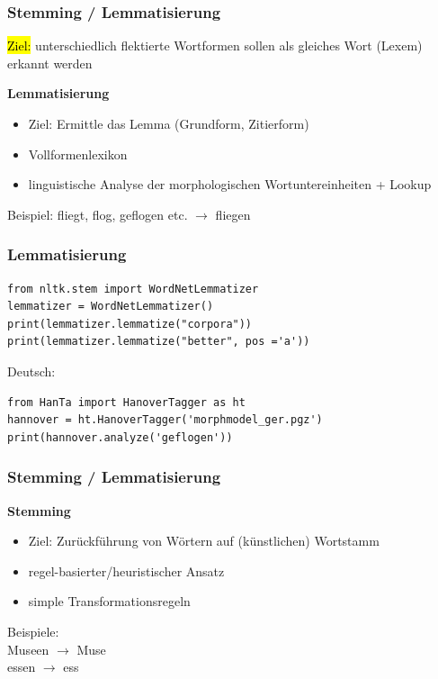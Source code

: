 
\begin{frame}
    \frametitle{Stemming / Lemmatisierung}
    \hl{Ziel:} unterschiedlich flektierte Wortformen sollen als gleiches Wort (Lexem) erkannt werden
    
    \textbf{Lemmatisierung}
    \begin{itemize}
    \item Ziel: Ermittle das Lemma (Grundform, Zitierform)
    \item Vollformenlexikon
    \item linguistische Analyse der morphologischen Wortuntereinheiten + Lookup 
    \end{itemize}
    Beispiel: 
    fliegt, flog, geflogen etc. $\rightarrow$ fliegen
\end{frame}
    
    
\begin{frame}[fragile]
    \frametitle{Lemmatisierung}


    \begin{verbatim}
from nltk.stem import WordNetLemmatizer 
lemmatizer = WordNetLemmatizer()
print(lemmatizer.lemmatize("corpora"))
print(lemmatizer.lemmatize("better", pos ='a'))
    \end{verbatim}

    Deutsch:
    \begin{verbatim}
from HanTa import HanoverTagger as ht
hannover = ht.HanoverTagger('morphmodel_ger.pgz')
print(hannover.analyze('geflogen'))
    \end{verbatim}
\end{frame}
    
    
\begin{frame}
    \frametitle{Stemming / Lemmatisierung}

    \textbf{Stemming}
    \begin{itemize}
    \item Ziel: Zurückführung von Wörtern auf (künstlichen) Wortstamm
    \item regel-basierter/heuristischer Ansatz
    \item simple Transformationsregeln
    \end{itemize}

    Beispiele: \\
    Museen $\rightarrow$ Muse\\
    essen $\rightarrow$ ess
    
\end{frame}
    
